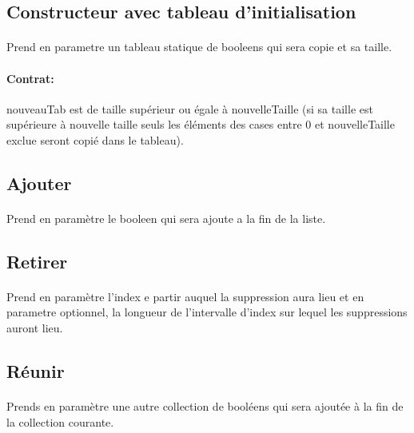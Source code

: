 \documentclass[a4paper, 12pts]{article}
\begin{document}
\subsection{Constructeur avec tableau d'initialisation}

\paragraph{}
Prend en parametre un tableau statique de booleens qui sera copie et sa taille.
\paragraph{Contrat:}
nouveauTab est de taille supérieur ou égale à nouvelleTaille (si sa taille est supérieure à nouvelle taille seuls les éléments des cases entre 0 et nouvelleTaille exclue seront copié dans le tableau).

\subsection{Ajouter}

\paragraph{}
Prend en paramètre le booleen qui sera ajoute a la fin de la liste.

\subsection{Retirer}

\paragraph{}
Prend en paramètre l'index e partir auquel la suppression aura lieu et en parametre optionnel, la longueur de l'intervalle d'index sur lequel les suppressions auront lieu.

\subsection{Réunir}

\paragraph{}
Prends en paramètre une autre collection de booléens qui sera ajoutée à la fin de la collection courante.
\end{document}
